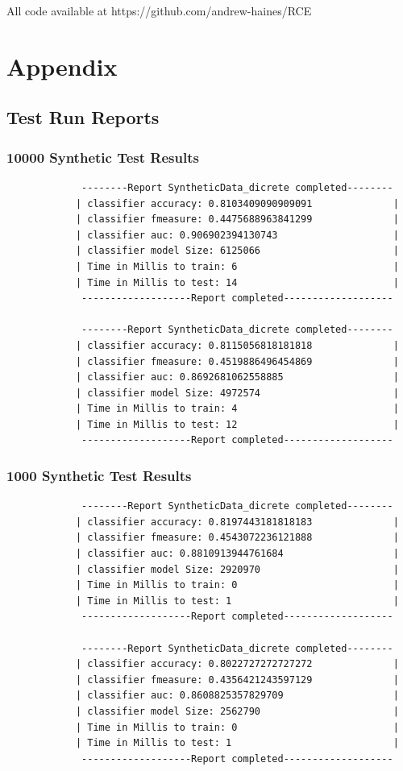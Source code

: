 \documentclass[a4paper,11pt]{scrreprt}
\begin{document}
\par{}%
\null\vfill

\parbox{\textwidth}{All code available at https://github.com/andrew-haines/RCE}

\printbibliography

\chapter{Appendix}
\printglossary[type=\acronymtype,title=Abreviations,nonumberlist]
\section{Test Run Reports}
\subsection{10000 Synthetic Test Results}
\begin{verbatim}
			 --------Report SyntheticData_dicrete completed--------
			| classifier accuracy: 0.8103409090909091              |
			| classifier fmeasure: 0.4475688963841299              |
			| classifier auc: 0.906902394130743                    |
			| classifier model Size: 6125066                       |
			| Time in Millis to train: 6                           |
			| Time in Millis to test: 14                           |
			 -------------------Report completed-------------------
			
			 --------Report SyntheticData_dicrete completed--------
			| classifier accuracy: 0.8115056818181818              |
			| classifier fmeasure: 0.4519886496454869              |
			| classifier auc: 0.8692681062558885                   |
			| classifier model Size: 4972574                       |
			| Time in Millis to train: 4                           |
			| Time in Millis to test: 12                           |
			 -------------------Report completed-------------------
\end{verbatim}			
\subsection{1000 Synthetic Test Results}
\begin{verbatim}
			 --------Report SyntheticData_dicrete completed--------
			| classifier accuracy: 0.8197443181818183              |
			| classifier fmeasure: 0.4543072236121888              |
			| classifier auc: 0.8810913944761684                   |
			| classifier model Size: 2920970                       |
			| Time in Millis to train: 0                           |
			| Time in Millis to test: 1                            |
			 -------------------Report completed-------------------
			
			 --------Report SyntheticData_dicrete completed--------
			| classifier accuracy: 0.8022727272727272              |
			| classifier fmeasure: 0.4356421243597129              |
			| classifier auc: 0.8608825357829709                   |
			| classifier model Size: 2562790                       |
			| Time in Millis to train: 0                           |
			| Time in Millis to test: 1                            |
			 -------------------Report completed-------------------
\end{verbatim}			
\end{document}
